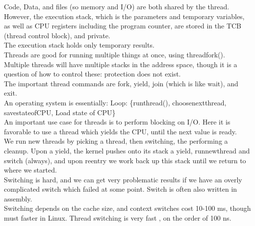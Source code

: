 \documentclass[paper=a4, fontsize=11pt]{scrartcl} %
\numberwithin{equation}{section} %
\numberwithin{figure}{section} %
\numberwithin{table}{section} %
\begin{document}
Code, Data, and files (so memory and I/O) are both shared by the thread. However, the execution stack, which is the parameters and temporary variables, as well as CPU registers including the program counter, are stored in the TCB (thread control block), and private.\\
The execution stack holds only temporary results. \\
Threads are good for running multiple things at once, using threadfork(). Multiple threads will have multiple stacks in the address space, though it is a question of how to control these: protection does not exist. \\
The important thread commands are fork, yield, join (which is like wait), and exit.\\
An operating system is essentially: Loop: \{runthread(), choosenextthread, savestateofCPU, Load state of CPU\}\\
An important use case for threads is to perform blocking on I/O. Here it is favorable to use a thread which yields the CPU, until the next value is ready. \\
We run new threads by picking a thread, then switching, the performing a cleanup. Upon a yield, the kernel pushes onto its stack a yield, runnewthread and switch (always), and upon reentry we work back up this stack until we return to where we started. \\
Switching is hard, and we can get very problematic results if we have an overly complicated switch which failed at some point. Switch is often also written in assembly. \\
Switching depends on the cache size, and context switches cost 10-100 ms, though must faster in Linux. Thread switching is very fast , on the order of 100 ns. \\
\end{document}
